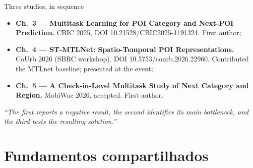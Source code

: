 \documentclass{beamer}
\begin{document}
\begin{frame}{Three studies, in sequence}
    \begin{itemize}\setlength{\itemsep}{5pt}
        \item \textbf{Ch.~3 --- Multitask Learning for POI Category and Next-POI Prediction.}
              CBIC 2025, DOI 10.21528/CBIC2025-1191324. First author;
        \item \textbf{Ch.~4 --- ST-MTLNet: Spatio-Temporal POI Representations.}
              CoUrb 2026 (SBRC workshop), DOI 10.5753/courb.2026.22960. Contributed the MTLnet
              baseline; presented at the event;
        \item \textbf{Ch.~5 --- A Check-in-Level Multitask Study of Next Category and Region.}
              MobiWac 2026, accepted. First author.
    \end{itemize}

    \medskip
    \begin{center}
        \small\itshape ``The first reports a negative result, the second identifies its main
        bottleneck, and the third tests the resulting solution.''
    \end{center}
\end{frame}

\section[Fundamentos]{Fundamentos compartilhados}
\end{document}
